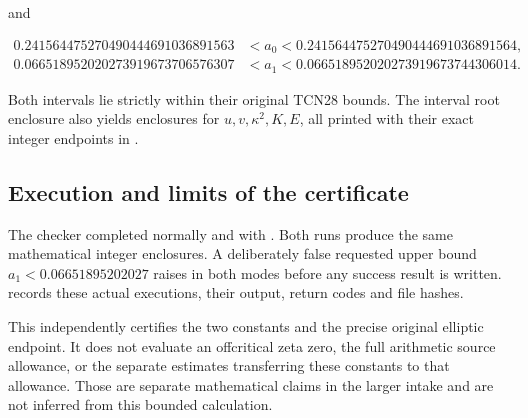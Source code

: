 \documentclass[11pt,a4paper]{article}
\begin{document}
and

\[
 \begin{aligned}
 0.241564475270490444691036891563
 &<a_0<0.241564475270490444691036891564,\\
 0.066518952020273919673706576307
 &<a_1<0.066518952020273919673744306014.
 \end{aligned}
\]

Both intervals lie strictly within their original TCN28 bounds. The interval root enclosure also yields enclosures for $u,v,\kappa^2,K,E$, all printed with their exact integer endpoints in \texttt{}.

\subsection{Execution and limits of the certificate}

The checker completed normally and with \texttt{}. Both runs produce the same mathematical integer enclosures. A deliberately false requested upper bound $a_1<0.06651895202027$ raises \texttt{} in both modes before any success result is written. \texttt{} records these actual executions, their output, return codes and file hashes.

This independently certifies the two constants and the precise original elliptic endpoint. It does not evaluate an offcritical zeta zero, the full arithmetic source allowance, or the separate estimates transferring these constants to that allowance. Those are separate mathematical claims in the larger intake and are not inferred from this bounded calculation.
\endgroup
\end{document}
